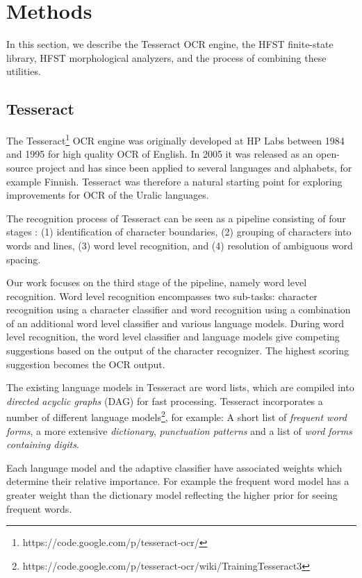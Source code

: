 \documentclass[b5paper]{article}
\begin{document}
\section{Methods}
\label{met} In this section, we describe the Tesseract OCR engine, the
HFST finite-state library, HFST morphological analyzers, and the
process of combining these utilities.

\subsection{Tesseract}
The Tesseract\footnote{https://code.google.com/p/tesseract-ocr/} OCR
engine \cite{smith07} was originally developed at HP Labs between 1984
and 1995 for high quality OCR of English. In 2005 it was released as
an open-source project and has since been applied to several languages
and alphabets, for example Finnish. Tesseract was therefore a natural
starting point for exploring improvements for OCR of the Uralic languages.

The recognition process of Tesseract can be seen as a pipeline
consisting of four stages \cite{smith07}: (1) identification of
character boundaries, (2) grouping of characters into words and lines,
(3) word level recognition, and (4) resolution of ambiguous word
spacing.

Our work focuses on the third stage of the pipeline, namely word level
recognition. Word level recognition encompasses two sub-tasks: character
recognition using a character classifier and word recognition using a
combination of an additional word level classifier and various
language models. During word level recognition, the word level classifier
and language models give competing suggestions based on the output of
the character recognizer. 
The highest scoring suggestion becomes the OCR output.%

The existing language models in Tesseract are word lists, which are
compiled into {\it directed acyclic graphs} (DAG) for fast
processing. Tesseract incorporates a number of different language
models\footnote{https://code.google.com/p/tesseract-ocr/wiki/TrainingTesseract3},
for example: A short list of {\it frequent word forms}, a more
extensive {\it dictionary}, {\it punctuation patterns} and a list of
{\it word forms containing digits}.

Each language model and the adaptive classifier have associated
weights which determine their relative importance. For example the
frequent word model has a greater weight than the dictionary
model reflecting the higher prior for seeing frequent words.
\end{document}
